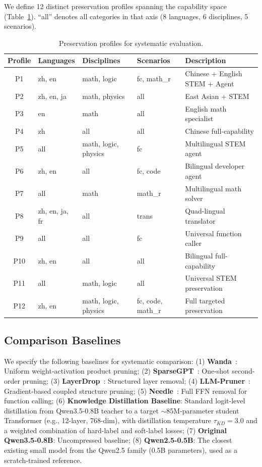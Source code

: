 \documentclass[twocolumn]{article}
\begin{document}
We define 12 distinct preservation profiles spanning the capability space (Table~\ref{tab:profiles}). ``all'' denotes all categories in that axis (8 languages, 6 disciplines, 5 scenarios).

\begin{table}[t]
\caption{Preservation profiles for systematic evaluation.}
\label{tab:profiles}
\centering
\small
\begin{tabular}{cllll}
\toprule
Profile & Languages & Disciplines & Scenarios & Description \\
\midrule
P1 & zh, en & math, logic & fc, math\_r & Chinese + English STEM + Agent \\
P2 & zh, en, ja & math, physics & all & East Asian + STEM \\
P3 & en & math & all & English math specialist \\
P4 & zh & all & all & Chinese full-capability \\
P5 & all & math, logic, physics & fc & Multilingual STEM agent \\
P6 & zh, en & all & fc, code & Bilingual developer agent \\
P7 & all & math & math\_r & Multilingual math solver \\
P8 & zh, en, ja, fr & all & trans & Quad-lingual translator \\
P9 & all & all & fc & Universal function caller \\
P10 & zh, en & all & all & Bilingual full-capability \\
P11 & all & math, logic & all & Universal STEM preservation \\
P12 & zh, en & math, logic, physics & fc, code, math\_r & Full targeted preservation \\
\bottomrule
\end{tabular}
\end{table}

\subsection{Comparison Baselines}

We specify the following baselines for systematic comparison:
(1) \textbf{Wanda}~\citep{sun2023wanda}: Uniform weight-activation product pruning;
(2) \textbf{SparseGPT}~\citep{frantar2023sparsegpt}: One-shot second-order pruning;
(3) \textbf{LayerDrop}~\citep{fan2020layerdrop}: Structured layer removal;
(4) \textbf{LLM-Pruner}~\citep{ma2023llmpruner}: Gradient-based coupled structure pruning;
(5) \textbf{Needle}~\citep{ndubuaku2026needle}: Full FFN removal for function calling;
(6) \textbf{Knowledge Distillation Baseline}: Standard logit-level distillation from Qwen3.5-0.8B teacher to a target $\sim$85M-parameter student Transformer (e.g., 12-layer, 768-dim), with distillation temperature $\tau_{KD}=3.0$ and a weighted combination of hard-label and soft-label losses;
(7) \textbf{Original Qwen3.5-0.8B}: Uncompressed baseline;
(8) \textbf{Qwen2.5-0.5B}: The closest existing small model from the Qwen2.5 family (0.5B parameters), used as a scratch-trained reference.
\end{document}
